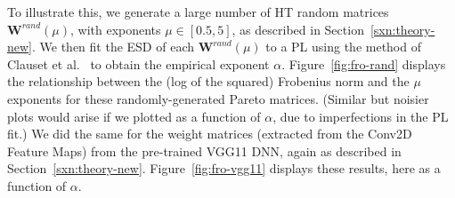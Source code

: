 To illustrate this, we generate a large number of HT random matrices $\mathbf{W}^{rand}(\mu)$, with exponents $\mu\in[0.5, 5]$, as described in Section~\ref{sxn:theory-new}.
%
We then fit the ESD of each $\mathbf{W}^{rand}(\mu)$ to a PL using the method of Clauset et al.~\cite{CSN09_powerlaw,ABP14} to obtain the empirical exponent $\alpha$. 
Figure~\ref{fig:fro-rand} displays the relationship between the (log of the squared) Frobenius norm and the $\mu$ exponents for these randomly-generated Pareto matrices.
(Similar but noisier plots would arise if we plotted as a function of $\alpha$, due to imperfections in the PL fit.)
We did the same for the weight matrices (extracted from the Conv2D Feature Maps) from the pre-trained VGG11 DNN, again as described in Section~\ref{sxn:theory-new}.
Figure~\ref{fig:fro-vgg11} displays these results, here as a function of $\alpha$.

